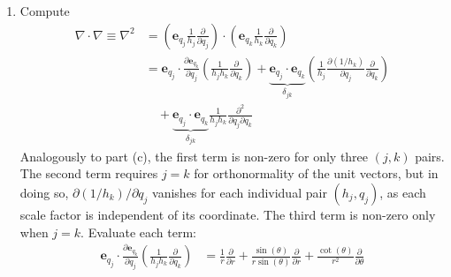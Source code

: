 \documentclass[a4paper]{article}
\begin{document}
\begin{enumerate}[label=(\alph*)]
	\[
		\frac{1}{r}u_{r} + \frac{\sin\!\left(\theta\right)}{r \sin\!\left(\theta\right)}u_{r} + \frac{\cos\!\left(\theta\right)}{r \sin\!\left(\theta\right)}u_{\theta} 
	\]
	Conclude
	\begin{align*}
		\nabla \cdot \pmb{u} & = \frac{2}{r}u_{r} + \frac{\cot\!\left(\theta\right)}{r}u_{\theta} + \frac{\partial u_{r}}{\partial r} + \frac{1}{r}\frac{\partial u_{\theta}}{\partial \theta} + \frac{1}{r \sin\!\left(\theta\right)}\frac{\partial u_{\phi}}{\partial \phi} \\
				     & = \frac{1}{r^{2}}\frac{\partial }{\partial r}\!\left( r^{2}u_{r} \right) + \frac{1}{r \sin\!\left(\theta\right)}\frac{\partial }{\partial \theta}\!\left( \sin\!\left(\theta\right)u_{\theta} \right) + \frac{1}{r \sin\!\left(\theta\right)}\frac{\partial u_{\phi}}{\partial \phi}
	\end{align*}
	\item Compute
	\begin{align*}
		\nabla \cdot \nabla \equiv \nabla^{2} & = \!\left( \pmb{e}_{q_{j}}\frac{1}{h_{j}}\frac{\partial }{\partial q_{j}} \right) \cdot \!\left( \pmb{e}_{q_{k}}\frac{1}{h_{k}}\frac{\partial }{\partial q_{k}} \right) \\
						      & = \pmb{e}_{q_{j}} \cdot \frac{\partial \pmb{e}_{q_{k}}}{\partial q_{j}}\!\left( \frac{1}{h_{j}h_{k}}\frac{\partial }{\partial q_{k}} \right) + \underbrace{\pmb{e}_{q_{j}} \cdot \pmb{e}_{q_{k}}}_{\delta_{jk}}\!\left( \frac{1}{h_{j}}\frac{\partial \!\left( 1 / h_{k} \right)}{\partial q_{j}}\frac{\partial }{\partial q_{k}} \right) \\
						      & \quad + \underbrace{\pmb{e}_{q_{j}} \cdot \pmb{e}_{q_{k}}}_{\delta_{jk}}\frac{1}{h_{j}h_{k}}\frac{\partial^2 }{\partial q_{j} \partial q_{k}}
	\end{align*}
	Analogously to part (c), the first term is non-zero for only three \( \!\left( j,k \right) \) pairs. The second term requires \( j = k \) for orthonormality of the unit vectors, but in doing so, \( \partial \!\left( 1/h_{k} \right) / \partial q_{j} \) vanishes for each individual pair \( \!\left( h_{j},q_{j} \right) \), as each scale factor is independent of its coordinate. The third term is non-zero only when \( j = k \). Evaluate each term:
	\begin{align*}
		\pmb{e}_{q_{j}} \cdot \frac{\partial \pmb{e}_{q_{k}}}{\partial q_{j}}\!\left( \frac{1}{h_{j}h_{k}}\frac{\partial }{\partial q_{k}} \right) & = \frac{1}{r}\frac{\partial }{\partial r} + \frac{\sin\!\left(\theta\right)}{r \sin\!\left(\theta\right)}\frac{\partial }{\partial r} + \frac{\cot\!\left(\theta\right)}{r^{2}}\frac{\partial }{\partial \theta} \\

\end{align*}
\end{enumerate}
\end{document}
